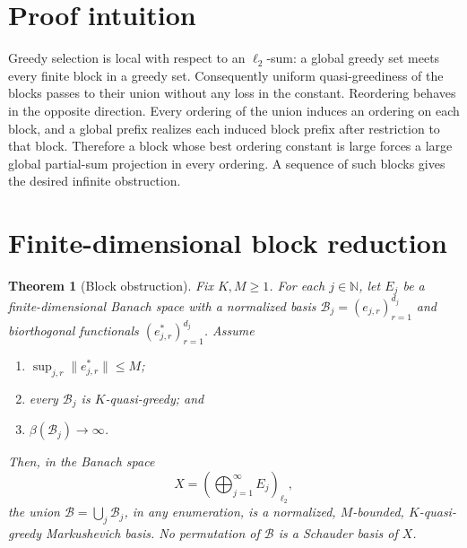 \documentclass[11pt]{article}
\newtheorem{theorem}{Theorem}
\newcommand{\N}{\mathbb N}
\newcommand{\cB}{\mathcal B}
\begin{document}
\section{Proof intuition}

Greedy selection is local with respect to an $\ell_2$-sum: a global greedy
set meets every finite block in a greedy set.  Consequently uniform
quasi-greediness of the blocks passes to their union without any loss in the
constant.  Reordering behaves in the opposite direction.  Every ordering of
the union induces an ordering on each block, and a global prefix realizes
each induced block prefix after restriction to that block.  Therefore a block
whose best ordering constant is large forces a large global partial-sum
projection in every ordering.  A sequence of such blocks gives the desired
infinite obstruction.

\section{Finite-dimensional block reduction}

\begin{theorem}[Block obstruction]
Fix $K,M\ge1$.  For each $j\in\N$, let $E_j$ be a finite-dimensional
Banach space with a normalized basis
$\cB_j=(e_{j,r})_{r=1}^{d_j}$ and biorthogonal functionals
$(e_{j,r}^*)_{r=1}^{d_j}$.  Assume
\begin{enumerate}
\item $\sup_{j,r}\|e_{j,r}^*\|\le M$;
\item every $\cB_j$ is $K$-quasi-greedy; and
\item $\beta(\cB_j)\to\infty$.
\end{enumerate}
Then, in the Banach space
\[
  X=\left(\bigoplus_{j=1}^{\infty}E_j\right)_{\ell_2},
\]
the union $\cB=\bigcup_j\cB_j$, in any enumeration, is a normalized,
$M$-bounded, $K$-quasi-greedy Markushevich basis.  No permutation of $\cB$
is a Schauder basis of $X$.
\end{theorem}
\end{document}
